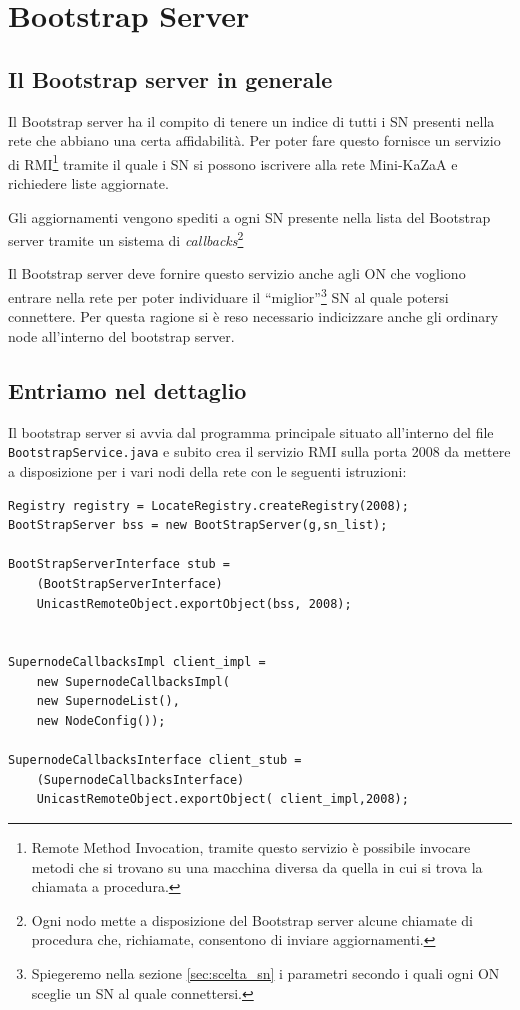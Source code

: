 \chapter{Bootstrap Server}

\section{Il Bootstrap server in generale}
Il Bootstrap server ha il compito di tenere un indice di tutti i SN presenti nella rete che abbiano
una certa affidabilità. 
Per poter fare questo fornisce un servizio di RMI\footnote{Remote Method Invocation, tramite questo servizio è possibile invocare metodi che si trovano su una macchina diversa da quella in cui si trova la chiamata a procedura.} tramite il quale i SN si possono iscrivere alla rete Mini-KaZaA e richiedere liste aggiornate.

Gli aggiornamenti vengono spediti a ogni SN presente nella lista del Bootstrap server tramite un sistema di \emph{callbacks}\footnote{Ogni nodo mette a disposizione del Bootstrap server alcune chiamate di procedura che, richiamate, consentono di inviare aggiornamenti.}

Il Bootstrap server deve fornire questo servizio anche agli ON che vogliono entrare nella rete per poter individuare il ``miglior''\footnote{Spiegeremo nella sezione \ref{sec:scelta_sn} i parametri secondo i quali ogni ON sceglie un SN al quale connettersi.} SN al quale potersi connettere.
Per questa ragione si è reso necessario indicizzare anche gli ordinary node all'interno del bootstrap server.

\section{Entriamo nel dettaglio}
Il bootstrap server si avvia dal programma principale situato all'interno del file \verb|BootstrapService.java| e subito crea il servizio RMI sulla porta 2008 da mettere a disposizione per i vari nodi della rete con le seguenti istruzioni:
\newline
\begin{lstlisting}
Registry registry = LocateRegistry.createRegistry(2008);
BootStrapServer bss = new BootStrapServer(g,sn_list);

BootStrapServerInterface stub = 
	(BootStrapServerInterface) 
	UnicastRemoteObject.exportObject(bss, 2008);


SupernodeCallbacksImpl client_impl = 
	new SupernodeCallbacksImpl(
	new SupernodeList(), 
	new NodeConfig());
            
SupernodeCallbacksInterface client_stub = 
	(SupernodeCallbacksInterface) 
	UnicastRemoteObject.exportObject( client_impl,2008);
\end{lstlisting}

